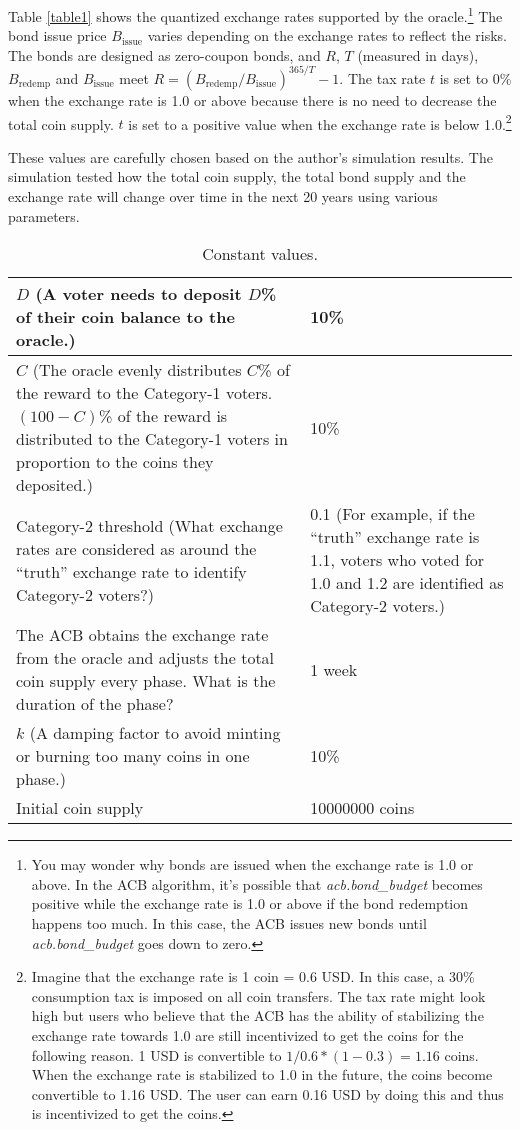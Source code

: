 \documentclass[dvipdfmx,a4paper]{article}
\begin{document}
Table \ref{table1} shows the quantized exchange rates supported by the oracle.\footnote{You may wonder why bonds are issued when the exchange rate is 1.0 or above. In the ACB algorithm, it's possible that \textit{acb.bond\_budget} becomes positive while the exchange rate is 1.0 or above if the bond redemption happens too much. In this case, the ACB issues new bonds until \textit{acb.bond\_budget} goes down to zero.} The bond issue price $B_{\mathrm{issue}}$ varies depending on the exchange rates to reflect the risks. The bonds are designed as zero-coupon bonds, and $R$, $T$ (measured in days), $B_{\mathrm{redemp}}$ and $B_{\mathrm{issue}}$ meet $R=(B_{\mathrm{redemp}}/B_{\mathrm{issue}})^{365/T}-1$. The tax rate $t$ is set to 0\% when the exchange rate is 1.0 or above because there is no need to decrease the total coin supply. $t$ is set to a positive value when the exchange rate is below 1.0.\footnote{Imagine that the exchange rate is 1 coin = 0.6 USD. In this case, a 30\% consumption tax is imposed on all coin transfers. The tax rate might look high but users who believe that the ACB has the ability of stabilizing the exchange rate towards 1.0 are still incentivized to get the coins for the following reason. 1 USD is convertible to $1 / 0.6 * (1 - 0.3) = 1.16$ coins. When the exchange rate is stabilized to 1.0 in the future, the coins become convertible to 1.16 USD. The user can earn 0.16 USD by doing this and thus is incentivized to get the coins.}

These values are carefully chosen based on the author's simulation results. The simulation tested how the total coin supply, the total bond supply and the exchange rate will change over time in the next 20 years using various parameters.

\begin{table}[htb]
\begin{center}
\caption{Constant values.}\vspace{2ex}
\begin{tabular}{p{26em}|p{10em}}\hline
$D$ (A voter needs to deposit $D$\% of their coin balance to the oracle.) & 10\%\\\hline
$C$ (The oracle evenly distributes $C$\% of the reward to the Category-1 voters. $(100-C)$\% of the reward is distributed to the Category-1 voters in proportion to the coins they deposited.) & 10\%\\\hline
Category-2 threshold (What exchange rates are considered as around the ``truth'' exchange rate to identify Category-2 voters?) & 0.1 (For example, if the ``truth'' exchange rate is 1.1, voters who voted for 1.0 and 1.2 are identified as Category-2 voters.)\\\hline
The ACB obtains the exchange rate from the oracle and adjusts the total coin supply every phase. What is the duration of the phase? & 1 week\\\hline
$k$ (A damping factor to avoid minting or burning too many coins in one phase.) & 10\%\\\hline
Initial coin supply & 10000000 coins\\\hline
\end{tabular}
\label{table2}
\end{center}
\end{table}
\end{document}
